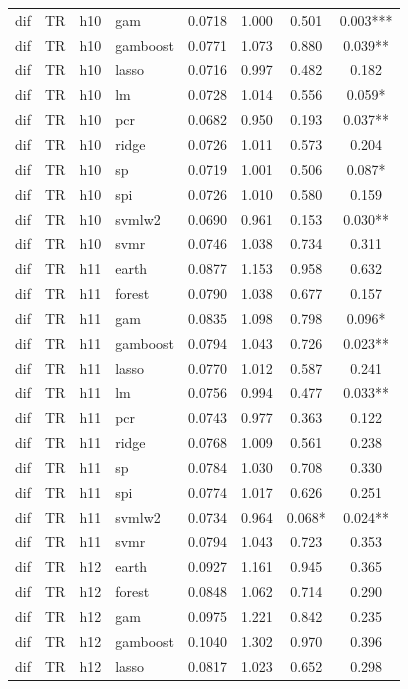 \begin{ThreePartTable}
\begin{longtable}[t]{llclcccc}
dif & TR & h10 & gam & 0.0718 & 1.000 & 0.501 & 0.003***\\
dif & TR & h10 & gamboost & 0.0771 & 1.073 & 0.880 & 0.039**\\
dif & TR & h10 & lasso & 0.0716 & 0.997 & 0.482 & 0.182\\
dif & TR & h10 & lm & 0.0728 & 1.014 & 0.556 & 0.059*\\
dif & TR & h10 & pcr & 0.0682 & 0.950 & 0.193 & 0.037**\\
dif & TR & h10 & ridge & 0.0726 & 1.011 & 0.573 & 0.204\\
dif & TR & h10 & sp & 0.0719 & 1.001 & 0.506 & 0.087*\\
dif & TR & h10 & spi & 0.0726 & 1.010 & 0.580 & 0.159\\
dif & TR & h10 & svmlw2 & 0.0690 & 0.961 & 0.153 & 0.030**\\
dif & TR & h10 & svmr & 0.0746 & 1.038 & 0.734 & 0.311\\
\addlinespace
dif & TR & h11 & earth & 0.0877 & 1.153 & 0.958 & 0.632\\
dif & TR & h11 & forest & 0.0790 & 1.038 & 0.677 & 0.157\\
dif & TR & h11 & gam & 0.0835 & 1.098 & 0.798 & 0.096*\\
dif & TR & h11 & gamboost & 0.0794 & 1.043 & 0.726 & 0.023**\\
dif & TR & h11 & lasso & 0.0770 & 1.012 & 0.587 & 0.241\\
dif & TR & h11 & lm & 0.0756 & 0.994 & 0.477 & 0.033**\\
dif & TR & h11 & pcr & 0.0743 & 0.977 & 0.363 & 0.122\\
dif & TR & h11 & ridge & 0.0768 & 1.009 & 0.561 & 0.238\\
dif & TR & h11 & sp & 0.0784 & 1.030 & 0.708 & 0.330\\
dif & TR & h11 & spi & 0.0774 & 1.017 & 0.626 & 0.251\\
dif & TR & h11 & svmlw2 & 0.0734 & 0.964 & 0.068* & 0.024**\\
dif & TR & h11 & svmr & 0.0794 & 1.043 & 0.723 & 0.353\\
\addlinespace
dif & TR & h12 & earth & 0.0927 & 1.161 & 0.945 & 0.365\\
dif & TR & h12 & forest & 0.0848 & 1.062 & 0.714 & 0.290\\
dif & TR & h12 & gam & 0.0975 & 1.221 & 0.842 & 0.235\\
dif & TR & h12 & gamboost & 0.1040 & 1.302 & 0.970 & 0.396\\
dif & TR & h12 & lasso & 0.0817 & 1.023 & 0.652 & 0.298\\

\end{longtable}
\end{ThreePartTable}
